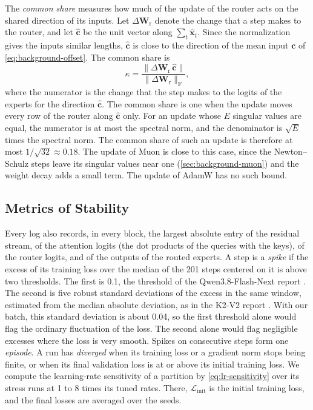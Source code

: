 The \emph{common share} measures how much of the update of the router acts on the shared direction of its inputs. Let $\Delta \mathbf{W}_{\mathrm{r}}$ denote the change that a step makes to the router, and let $\hat{\mathbf{c}}$ be the unit vector along $\sum_t \hat{\mathbf{x}}_t$. Since the normalization gives the inputs similar lengths, $\hat{\mathbf{c}}$ is close to the direction of the mean input $\mathbf{c}$ of \cref{eq:background-offset}. The common share is
\begin{equation}[eq:method-common-share]{}
  \kappa = \frac{\lVert \Delta \mathbf{W}_{\mathrm{r}} \, \hat{\mathbf{c}} \rVert}{\lVert \Delta \mathbf{W}_{\mathrm{r}} \rVert_{\mathrm{F}}},
\end{equation}
where the numerator is the change that the step makes to the logits of the experts for the direction $\hat{\mathbf{c}}$. The common share is one when the update moves every row of the router along $\hat{\mathbf{c}}$ only. For an update whose $E$ singular values are equal, the numerator is at most the spectral norm, and the denominator is $\sqrt{E}$ times the spectral norm. The common share of such an update is therefore at most $1 / \sqrt{32} \approx 0.18$. The update of Muon is close to this case, since the Newton--Schulz steps leave its singular values near one (\cref{sec:background-muon}) and the weight decay adds a small term. The update of AdamW has no such bound.

\subsection{Metrics of Stability}
\label{sec:method-stability}
Every log also records, in every block, the largest absolute entry of the residual stream, of the attention logits (the dot products of the queries with the keys), of the router logits, and of the outputs of the routed experts. A step is a \emph{spike} if the excess of its training loss over the median of the 201 steps centered on it is above two thresholds. The first is 0.1, the threshold of the Qwen3.8-Flash-Next report \cite{qiu2026qwennext}. The second is five robust standard deviations of the excess in the same window, estimated from the median absolute deviation, as in the K2-V2 report \cite{k2team2025k2v2}. With our batch, this standard deviation is about 0.04, so the first threshold alone would flag the ordinary fluctuation of the loss. The second alone would flag negligible excesses where the loss is very smooth. Spikes on consecutive steps form one \emph{episode}. A run has \emph{diverged} when its training loss or a gradient norm stops being finite, or when its final validation loss is at or above its initial training loss. We compute the learning-rate sensitivity of a partition by \cref{eq:lr-sensitivity} over its stress runs at 1 to 8 times its tuned rates. There, $\mathcal{L}_{\mathrm{init}}$ is the initial training loss, and the final losses are averaged over the seeds.

